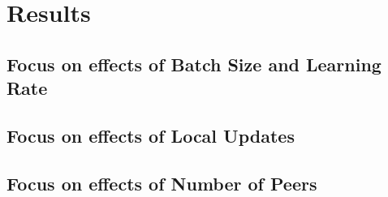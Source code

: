 \chapter{Results}\label{chapter:results}

\section{Focus on effects of Batch Size and Learning Rate}

\section{Focus on effects of Local Updates}

\section{Focus on effects of Number of Peers}
